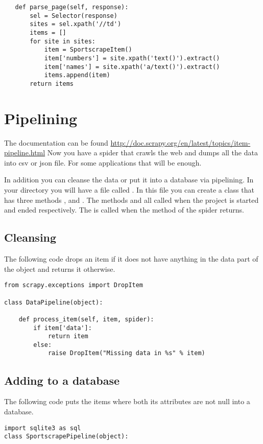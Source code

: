 {\begin{lstlisting}
   def parse_page(self, response):
       sel = Selector(response)
       sites = sel.xpath('//td')
       items = []
       for site in sites:
           item = SportscrapeItem()
           item['numbers'] = site.xpath('text()').extract()
           item['names'] = site.xpath('a/text()').extract()
           items.append(item)
       return items
\end{lstlisting}

\section*{Pipelining}

The documentation can be found \url{http://doc.scrapy.org/en/latest/topics/item-pipeline.html}
Now you have a spider that crawls the web and dumps all the data into csv or json file. For some applications that will be enough. 

In addition you can cleanse the data or put it into a database via pipelining. In your directory  you will have a file called . In this file you can create a class that has three methods ,  and . The methods  and  all called when the project is started and ended respectively. The  is called when the  method of the spider returns. 

\subsection*{Cleansing}

The following code drops an item if it does not have anything in the data part of the object and returns it otherwise.

\begin{lstlisting}
from scrapy.exceptions import DropItem

class DataPipeline(object):

    def process_item(self, item, spider):
        if item['data']:
            return item
        else:
            raise DropItem("Missing data in %s" % item)
\end{lstlisting}

\subsection*{Adding to a database}
The following code puts the items where both its attributes are not null into a database. 
\begin{lstlisting}
import sqlite3 as sql
class SportscrapePipeline(object):
	

\end{lstlisting}}

